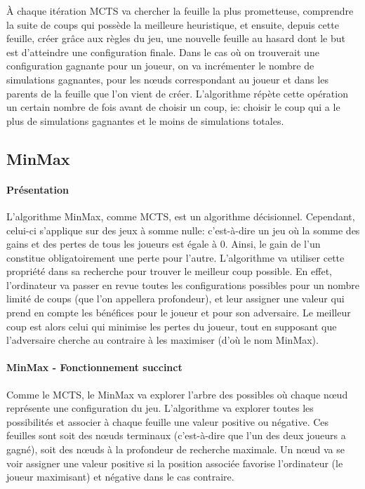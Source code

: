 À chaque itération MCTS va chercher la feuille la plus prometteuse, comprendre la suite de coups qui possède la meilleure heuristique, 
et ensuite, depuis cette feuille, créer grâce aux règles du jeu, une nouvelle feuille au hasard dont le but est d'atteindre une configuration finale.
Dans le cas où on trouverait une configuration gagnante pour un joueur, on va incrémenter le nombre de simulations gagnantes, pour les nœuds
correspondant au joueur et dans les parents de la feuille que l'on vient de créer.
L'algorithme répète cette opération un certain nombre de fois avant de choisir un coup, ie: choisir le coup qui a le plus de simulations
gagnantes et le moins de simulations totales.



\subsection{MinMax}

\paragraph{Présentation}
L'algorithme MinMax, comme MCTS, est un algorithme décisionnel. Cependant, celui-ci s'applique sur des jeux à somme nulle: c'est-à-dire
un jeu où la somme des gains et des pertes de tous les joueurs est égale à 0. Ainsi, le gain de l'un constitue 
obligatoirement une perte pour l'autre. L'algorithme va utiliser cette propriété dans sa recherche pour trouver le meilleur coup possible.
En effet, l'ordinateur va passer en revue toutes les configurations possibles pour un nombre limité de coups (que l'on appellera profondeur), 
et leur assigner une valeur qui prend en compte les bénéfices pour le joueur et pour son adversaire. Le meilleur coup est alors celui qui 
minimise les pertes du joueur, tout en supposant que l'adversaire cherche au contraire à les maximiser (d'où le nom MinMax).

\paragraph{MinMax - Fonctionnement succinct}
Comme le MCTS, le MinMax va explorer l'arbre des possibles où chaque nœud représente une configuration du jeu. 
L'algorithme va explorer toutes les possibilités et associer à chaque feuille une valeur positive ou négative. Ces feuilles sont
soit des nœuds terminaux (c'est-à-dire que l'un des deux joueurs a gagné), soit des nœuds à la profondeur de recherche maximale.
Un nœud va se voir assigner une valeur positive si la position associée favorise l'ordinateur (le joueur maximisant) 
et négative dans le cas contraire.

